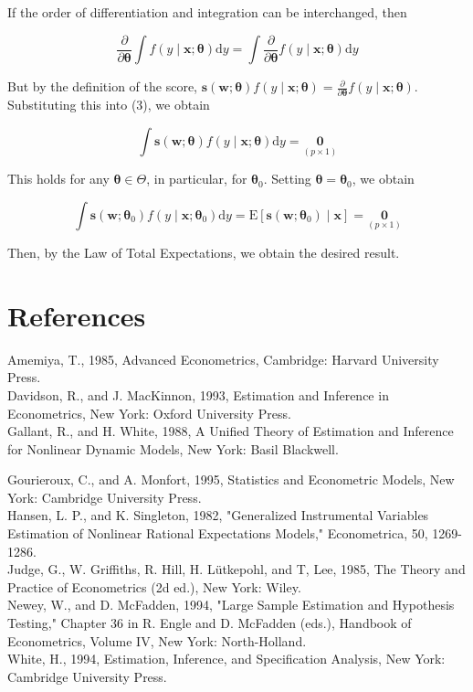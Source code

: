 \documentclass[10pt]{article}
\begin{document}
If the order of differentiation and integration can be interchanged, then


\begin{equation*}
\frac{\partial}{\partial \boldsymbol{\theta}} \int f(y \mid \mathbf{x} ; \boldsymbol{\theta}) \mathrm{d} y=\int \frac{\partial}{\partial \boldsymbol{\theta}} f(y \mid \mathbf{x} ; \boldsymbol{\theta}) \mathrm{d} y \tag{3}
\end{equation*}


But by the definition of the score, $\mathbf{s}(\mathbf{w} ; \boldsymbol{\theta}) f(y \mid \mathbf{x} ; \boldsymbol{\theta})=\frac{\partial}{\partial \boldsymbol{\theta}} f(y \mid \mathbf{x} ; \boldsymbol{\theta})$. Substituting this into (3), we obtain


\begin{equation*}
\int \mathbf{s}(\mathbf{w} ; \boldsymbol{\theta}) f(y \mid \mathbf{x} ; \boldsymbol{\theta}) \mathrm{d} y=\underset{(p \times 1)}{\mathbf{0}} \tag{4}
\end{equation*}


This holds for any $\boldsymbol{\theta} \in \Theta$, in particular, for $\boldsymbol{\theta}_{0}$. Setting $\boldsymbol{\theta}=\boldsymbol{\theta}_{0}$, we obtain


\begin{equation*}
\int \mathbf{s}\left(\mathbf{w} ; \boldsymbol{\theta}_{0}\right) f\left(y \mid \mathbf{x} ; \boldsymbol{\theta}_{0}\right) \mathrm{d} y=\mathrm{E}\left[\mathbf{s}\left(\mathbf{w} ; \boldsymbol{\theta}_{0}\right) \mid \mathbf{x}\right]=\underset{(p \times 1)}{\mathbf{0}} \tag{5}
\end{equation*}


Then, by the Law of Total Expectations, we obtain the desired result.

\section*{References}
Amemiya, T., 1985, Advanced Econometrics, Cambridge: Harvard University Press.\\
Davidson, R., and J. MacKinnon, 1993, Estimation and Inference in Econometrics, New York: Oxford University Press.\\
Gallant, R., and H. White, 1988, A Unified Theory of Estimation and Inference for Nonlinear Dynamic Models, New York: Basil Blackwell.

Gourieroux, C., and A. Monfort, 1995, Statistics and Econometric Models, New York: Cambridge University Press.\\
Hansen, L. P., and K. Singleton, 1982, "Generalized Instrumental Variables Estimation of Nonlinear Rational Expectations Models," Econometrica, 50, 1269-1286.\\
Judge, G., W. Griffiths, R. Hill, H. Lütkepohl, and T, Lee, 1985, The Theory and Practice of Econometrics (2d ed.), New York: Wiley.\\
Newey, W., and D. McFadden, 1994, "Large Sample Estimation and Hypothesis Testing," Chapter 36 in R. Engle and D. McFadden (eds.), Handbook of Econometrics, Volume IV, New York: North-Holland.\\
White, H., 1994, Estimation, Inference, and Specification Analysis, New York: Cambridge University Press.
\end{document}
